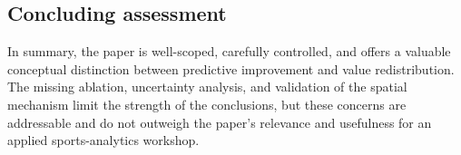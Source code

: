 \documentclass[11pt,a4paper]{article}
\begin{document}
\subsection{Concluding assessment}

\begin{reviewbox}
In summary, the paper is well-scoped, carefully controlled, and offers a valuable conceptual distinction between predictive improvement and value redistribution. The missing ablation, uncertainty analysis, and validation of the spatial mechanism limit the strength of the conclusions, but these concerns are addressable and do not outweigh the paper’s relevance and usefulness for an applied sports-analytics workshop.
\end{reviewbox}
\end{document}
